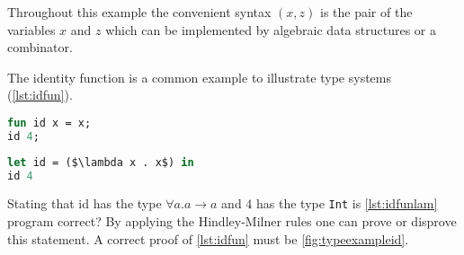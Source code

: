 \documentclass[11pt,oneside,a4paper]{report}
\begin{document}
\begin{exmp}
\label{exmp:letpoly}
Throughout this example the convenient syntax $(x, z)$ is the pair of the variables $x$ and $z$ which can be implemented by algebraic data structures or a combinator.

The identity function is a common example to illustrate type systems (\autoref{lst:idfun}).
\begin{lstlisting}[language=ML,caption={Identity function in $L$},label={lst:idfun}]
fun id x = x;
id 4;
\end{lstlisting}
\begin{lstlisting}[language=ML,caption={Identity function in lambda calculus with let},label={lst:idfunlam},mathescape=true]
let id = ($\lambda x . x$) in
id 4
\end{lstlisting}
Stating that id has the type $\forall a.a \rightarrow a$ and $4$ has the type \texttt{Int} is \autoref{lst:idfunlam} program correct?
By applying the Hindley-Milner rules one can prove or disprove this statement.
A correct proof of \autoref{lst:idfun} must be \autoref{fig:typeexampleid}.


\end{exmp}
\end{document}
